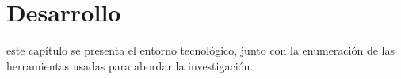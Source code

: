 \chapter{Desarrollo}
\label{chap:desarrollo}

 este capítulo se presenta el entorno tecnológico, junto con la enumeración de las herramientas usadas para
abordar la investigación.
